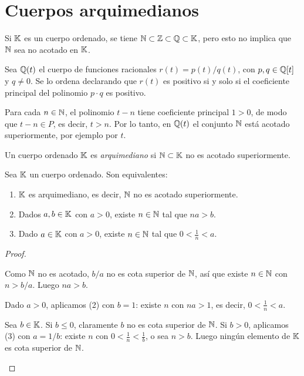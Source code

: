 \section{Cuerpos arquimedianos}

Si \(\mathbb{K}\) es un cuerpo ordenado, se tiene \(\mathbb{N} \subset \mathbb{Z} \subset \mathbb{Q} \subset \mathbb{K}\), pero esto no implica que \(\mathbb{N}\) sea no acotado en \(\mathbb{K}\).

\begin{eg}
  Sea \(\mathbb{Q}(t)\) el cuerpo de funciones racionales \(r(t) = p(t)/q(t)\), con \(p, q \in \mathbb{Q}[t]\) y \(q \neq 0\). Se lo ordena declarando que \(r(t)\) es positivo si y solo si el coeficiente principal del polinomio \(p \cdot q\) es positivo.

  Para cada \(n \in \mathbb{N}\), el polinomio \(t - n\) tiene coeficiente principal \(1 > 0\), de modo que \(t - n \in P\), es decir, \(t > n\). Por lo tanto, en \(\mathbb{Q}(t)\) el conjunto \(\mathbb{N}\) está acotado superiormente, por ejemplo por \(t\).
\end{eg}

\begin{definition}
  Un cuerpo ordenado \(\mathbb{K}\) es \emph{arquimediano} si \(\mathbb{N} \subset \mathbb{K}\) no es acotado superiormente.
\end{definition}

\begin{theorem}
  Sea \(\mathbb{K}\) un cuerpo ordenado. Son equivalentes:
  \begin{enumerate}[label=(\arabic*)]
    \item \(\mathbb{K}\) es arquimediano, es decir, \(\mathbb{N}\) no es acotado superiormente.
    \item Dados \(a, b \in \mathbb{K}\) con \(a > 0\), existe \(n \in \mathbb{N}\) tal que \(n a > b\).
    \item Dado \(a \in \mathbb{K}\) con \(a > 0\), existe \(n \in \mathbb{N}\) tal que \(0 < \frac{1}{n} < a\).
  \end{enumerate}
\end{theorem}

\begin{proof}
  \begin{description}[font=\normalfont, style=nextline, leftmargin=2em, itemsep=0.3em]
    \item[(1) \(\Rightarrow\) (2)] Como \(\mathbb{N}\) no es acotado, \(b/a\) no es cota superior de \(\mathbb{N}\), así que existe \(n \in \mathbb{N}\) con \(n > b/a\). Luego \(na > b\).
    \item[(2) \(\Rightarrow\) (3)] Dado \(a > 0\), aplicamos (2) con \(b = 1\): existe \(n\) con \(na > 1\), es decir, \(0 < \frac{1}{n} < a\).
    \item[(3) \(\Rightarrow\) (1)] Sea \(b \in \mathbb{K}\). Si \(b \leq 0\), claramente \(b\) no es cota superior de \(\mathbb{N}\). Si \(b > 0\), aplicamos (3) con \(a = 1/b\): existe \(n\) con \(0 < \frac{1}{n} < \frac{1}{b}\), o sea \(n > b\). Luego ningún elemento de \(\mathbb{K}\) es cota superior de \(\mathbb{N}\).\qedhere
  \end{description}
\end{proof}

